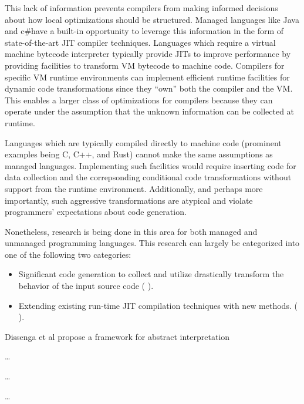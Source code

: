 \documentclass[nobib]{tufte-handout}
\newcommand{\placeholdertext}[1]{
	\noindent{\color{red}{#1}}
}
\newcommand{\csharp}{c\#}
\begin{document}
This lack of information prevents compilers from making informed decisions about how local optimizations should be structured.  Managed languages like Java and \csharp have a built-in opportunity to leverage this information in the form of state-of-the-art JIT compiler techniques.  Languages which require a virtual machine bytecode interpreter typically provide JITs to improve performance by providing facilities to transform VM bytecode to machine code.  Compilers for specific VM runtime environments can implement efficient runtime facilities for dynamic code transformations since they ``own'' both the compiler and the VM.  This enables a larger class of optimizations for compilers because they can operate under the assumption that the unknown information can be collected at runtime.

Languages which are typically compiled directly to machine code (prominent examples being C, C++, and Rust) cannot make the same assumptions as managed languages.  Implementing such facilities would require inserting code for data collection and the correpsonding conditional code transformations without support from the runtime environment.  Additionally, and perhaps more importantly, such aggressive transformations are atypical and violate programmers' expectations about code generation.  

Nonetheless, research is being done in this area for both managed and unmanaged programming languages.  This research can largely be categorized into one of the following two categories:
\begin{itemize}
\item Significant code generation to collect and utilize drastically transform the behavior of the input source code (\placeholdertext{WHOMST?}).
\item Extending existing run-time JIT compilation techniques with new methods. (\placeholdertext{WHOMST'D?}).
\end{itemize}

Dissenga et al propose a framework for abstract interpretation 

\placeholdertext{Programmer-visible vs Programmer-invisible optimizations} \ldots \newline
\placeholdertext{Abstract Interpretation} \ldots \newline
\placeholdertext{Tracing JIT Compilation (recently combined with Abstract Interpretation Micro\$oft)} \ldots \newline
\end{document}
